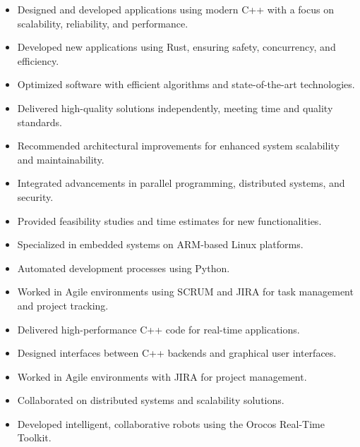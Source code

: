 \documentclass[10pt,a4paper,ragged2e,withhyper]{altacv}
\begin{document}
\begin{paracol}{2}


\begin{itemize}
\item Designed and developed applications using modern C++ with a focus on scalability, reliability, and performance.
\item Developed new applications using Rust, ensuring safety, concurrency, and efficiency.
\item Optimized software with efficient algorithms and state-of-the-art technologies.
\item Delivered high-quality solutions independently, meeting time and quality standards.
\item Recommended architectural improvements for enhanced system scalability and maintainability.
\item Integrated advancements in parallel programming, distributed systems, and security.
\item Provided feasibility studies and time estimates for new functionalities.
\item Specialized in embedded systems on ARM-based Linux platforms.
\item Automated development processes using Python.
\item Worked in Agile environments using SCRUM and JIRA for task management and project tracking.
\end{itemize}

\divider

\begin{itemize}
\item Delivered high-performance C++ code for real-time applications.
\item Designed interfaces between C++ backends and graphical user interfaces.
\item Worked in Agile environments with JIRA for project management.
\item Collaborated on distributed systems and scalability solutions.
\item Developed intelligent, collaborative robots using the Orocos Real-Time Toolkit.
\end{itemize}


\end{paracol}
\end{document}
